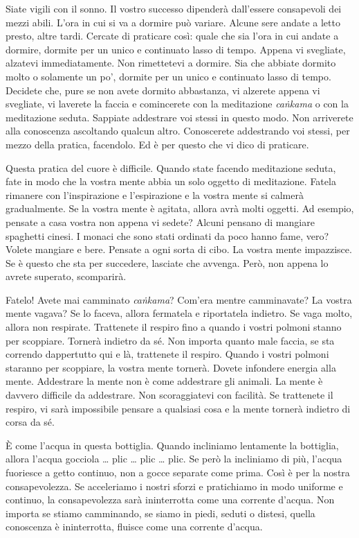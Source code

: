 Siate vigili con il sonno. Il vostro successo dipenderà dall'essere
consapevoli dei mezzi abili. L'ora in cui si va a dormire può variare.
Alcune sere andate a letto presto, altre tardi. Cercate di praticare
così: quale che sia l'ora in cui andate a dormire, dormite per un unico
e continuato lasso di tempo. Appena vi svegliate, alzatevi
immediatamente. Non rimettetevi a dormire. Sia che abbiate dormito molto
o solamente un po', dormite per un unico e continuato lasso di tempo.
Decidete che, pure se non avete dormito abbastanza, vi alzerete appena
vi svegliate, vi laverete la faccia e comincerete con la meditazione
\emph{caṅkama} o con la meditazione seduta. Sappiate addestrare voi
stessi in questo modo. Non arriverete alla conoscenza ascoltando qualcun
altro. Conoscerete addestrando voi stessi, per mezzo della pratica,
facendolo. Ed è per questo che vi dico di praticare.

Questa pratica del cuore è difficile. Quando state facendo meditazione
seduta, fate in modo che la vostra mente abbia un solo oggetto di
meditazione. Fatela rimanere con l'inspirazione e l'espirazione e la
vostra mente si calmerà gradualmente. Se la vostra mente è agitata,
allora avrà molti oggetti. Ad esempio, pensate a casa vostra non appena
vi sedete? Alcuni pensano di mangiare spaghetti cinesi. I monaci che
sono stati ordinati da poco hanno fame, vero? Volete mangiare e bere.
Pensate a ogni sorta di cibo. La vostra mente impazzisce. Se è questo
che sta per succedere, lasciate che avvenga. Però, non appena lo avrete
superato, scomparirà.

Fatelo! Avete mai camminato \emph{caṅkama}? Com'era mentre camminavate?
La vostra mente vagava? Se lo faceva, allora fermatela e riportatela
indietro. Se vaga molto, allora non respirate. Trattenete il respiro
fino a quando i vostri polmoni stanno per scoppiare. Tornerà indietro da
sé. Non importa quanto male faccia, se sta correndo dappertutto qui e
là, trattenete il respiro. Quando i vostri polmoni staranno per
scoppiare, la vostra mente tornerà. Dovete infondere energia alla mente.
Addestrare la mente non è come addestrare gli animali. La mente è
davvero difficile da addestrare. Non scoraggiatevi con facilità. Se
trattenete il respiro, vi sarà impossibile pensare a qualsiasi cosa e la
mente tornerà indietro di corsa da sé.

È come l'acqua in questa bottiglia. Quando incliniamo lentamente la
bottiglia, allora l'acqua gocciola \ldots{} plic \ldots{} plic \ldots{} plic. Se però
la incliniamo di più, l'acqua fuoriesce a getto continuo, non a gocce
separate come prima. Così è per la nostra consapevolezza. Se acceleriamo
i nostri sforzi e pratichiamo in modo uniforme e continuo, la
consapevolezza sarà ininterrotta come una corrente d'acqua. Non importa
se stiamo camminando, se siamo in piedi, seduti o distesi, quella
conoscenza è ininterrotta, fluisce come una corrente d'acqua.


